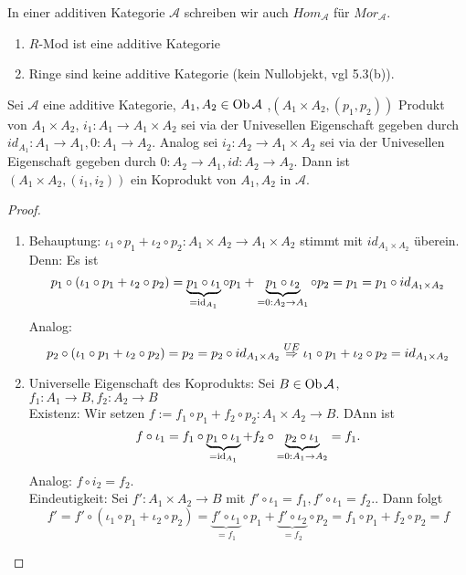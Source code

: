 \begin{anm}
	In einer additiven Kategorie $\mathcal{A} $ schreiben wir auch $Hom_{\mathcal{A}}$ für $Mor_{\mathcal{A}}. $
\end{anm}
\begin{bsp}
	\begin{enumerate} [label=\alph*)]
		\item $R$-Mod ist eine additive Kategorie
		\item Ringe sind keine additive Kategorie (kein Nullobjekt, vgl 5.3(b)).
	\end{enumerate}
\end{bsp}
\begin{sa}
	Sei $\mathcal{A} $ eine additive Kategorie, $ A_1,A_2 \in \text{Ob}\,\mathcal{A}$ ,$(A_1 \times A_2, (p_1,p_2)) $ Produkt von $ A_1 \times A_2 $, $ i_1: A_1 \to A_1 \times A_2 $ sei via der Univesellen Eigenschaft gegeben durch $id_{A_1}: A_1 \to A_1 , 0: A_1 \to A_2$. Analog sei $ i_2: A_2 \to A_1 \times A_2 $ sei via der Univesellen Eigenschaft gegeben durch $ 0: A_2 \to A_1, id: A_2 \to A_2$. Dann ist $(A_1 \times A_2, (i_1,i_2)) $ ein Koprodukt von $A_1,A_2$ in $\mathcal{A}$.
\end{sa}
\begin{proof}
	\begin{enumerate}
		\item Behauptung: $\iota_1 \circ p_1 + \iota_2 \circ p_2: A_1 \times A_2 \to A_1 \times A_2 $ stimmt mit $id_{A_1 \times A_2} $ überein. Denn: Es ist
		$$p_1 \circ (\iota_1 \circ p_1 + \iota_2 \circ p_2) = \underbrace{p_1 \circ \iota_1}_{=\operatorname{id}_{A_1}} \circ p_1+ \underbrace{p_1 \circ \iota_2}_{=0:A_2\to A_1} \circ p_2 = p_1 = p_1 \circ id_{A_1 \times A_2}$$ 
		Analog: $$p_2 \circ (\iota_1 \circ p_1 + \iota_2 \circ p_2) = p_2 = p_2 \circ id_{A_1 \times A_2} \overset{UE}{\Rightarrow} \iota_1 \circ p_1 + \iota_2 \circ p_2 = id_{A_1 \times A_2}$$
		\item Universelle Eigenschaft des Koprodukts:
		 Sei $ B \in \text{Ob}\,\mathcal{A} $, $ f_1: A_1 \to B, f_2: A_2 \to B $\\
		 Existenz: Wir setzen $f:= f_1 \circ p_1 + f_2 \circ p_2: A_1 \times A_2 \to B$. DAnn ist 
		 $$f \circ \iota_1 = f_1 \circ \underbrace{p_1 \circ \iota_1}_{=\operatorname{id}_{A_1}} + f_2 \circ \underbrace{p_2 \circ \iota_1}_{=0:A_1 \to A_2} = f_1.$$
		Analog: $f \circ i_2 = f_2.$\\
		Eindeutigkeit: Sei $f': A_1 \times A_2 \to B $ mit $f' \circ \iota_1 = f_1 , f' \circ \iota_1 = f_2.$. Dann folgt 
		$$f' = f' \circ (\iota_1 \circ p_1 + \iota_2 \circ p_2 ) = \underbrace{f' \circ \iota_1}_{=f_1}  \circ p_1 + \underbrace{f' \circ  \iota_2}_{=f_2} \circ p_2 = f_1 \circ p_1 + f_2 \circ p_2 = f $$
	\end{enumerate}
\end{proof}
